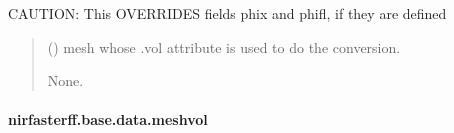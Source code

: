 \documentclass[letterpaper,10pt,english]{sphinxmanual}
\begin{document}
\begin{fulllineitems}
\begin{fulllineitems}
\sphinxAtStartPar
CAUTION: This OVERRIDES fields phix and phifl, if they are defined
\begin{quote}\begin{description}
\sphinxAtStartPar
{} () \textendash{} mesh whose .vol attribute is used to do the conversion.

\sphinxAtStartPar
None.

\end{description}\end{quote}

\end{fulllineitems}


\end{fulllineitems}


\sphinxstepscope


\paragraph{nirfasterff.base.data.meshvol}
\label{\detokenize{_autosummary/nirfasterff.base.data.meshvol:nirfasterff-base-data-meshvol}}\label{\detokenize{_autosummary/nirfasterff.base.data.meshvol::doc}}
\end{document}
